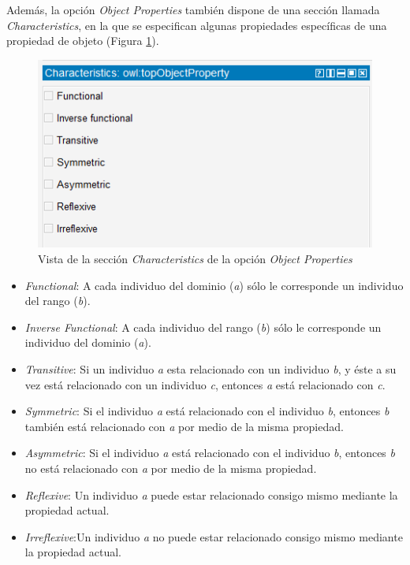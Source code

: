 Además, la opción \textit{Object Properties} también dispone de una sección llamada \textit{Characteristics}, en la que 
se especifican algunas propiedades específicas de una propiedad de objeto (Figura \ref*{ObjectProperties_characteristics}). 

\begin{figure}[H]
    \centering
    \includegraphics[scale=0.8]{Figures/Protege/ObjectProperties_characteristics.png}
    \caption{Vista de la sección \textit{Characteristics} de la opción \textit{Object Properties}}
    \label{ObjectProperties_characteristics}
\end{figure}

\begin{itemize}
    \item \textit{Functional}: A cada individuo del dominio (\textit{a}) sólo le corresponde un individuo del rango (\textit{b}).
    \item \textit{Inverse Functional}:  A cada individuo del rango (\textit{b}) sólo le corresponde un individuo del dominio (\textit{a}).
    \item \textit{Transitive}: Si un individuo \textit{a} esta relacionado con un individuo \textit{b}, y éste a su vez está
    relacionado con un individuo \textit{c}, entonces \textit{a} está relacionado con \textit{c}.
    \item \textit{Symmetric}: Si el individuo \textit{a} está relacionado con el individuo \textit{b}, entonces \textit{b} también 
    está relacionado con \textit{a} por medio de la misma propiedad.
    \item \textit{Asymmetric}: Si el individuo \textit{a} está relacionado con el individuo \textit{b}, entonces \textit{b} no 
    está relacionado con \textit{a} por medio de la misma propiedad.
    \item \textit{Reflexive}: Un individuo \textit{a} puede estar relacionado consigo mismo mediante la propiedad actual.
    \item \textit{Irreflexive}:Un individuo \textit{a} no puede estar relacionado consigo mismo mediante la propiedad actual.
\end{itemize}

